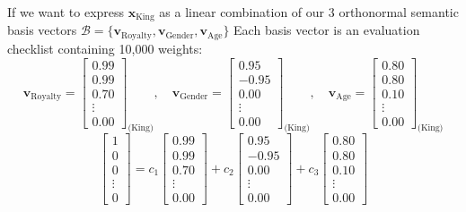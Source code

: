 \documentclass[DIV=20,oneside]{scrartcl}
\begin{document}
If we want to express $\mathbf{x}_{\text{King}}$ as a linear combination of our 3 orthonormal semantic basis vectors $\mathcal{B} = \{\mathbf{v}_{\text{Royalty}}, \mathbf{v}_{\text{Gender}}, \mathbf{v}_{\text{Age}}\}$
Each basis vector is an evaluation checklist containing 10,000 weights:
$$\mathbf{v}_{\text{Royalty}} = \begin{bmatrix} 0.99 \\ 0.99 \\ 0.70 \\ \vdots \\ 0.00 \end{bmatrix}_{\text{(King)}} , \quad \mathbf{v}_{\text{Gender}} = \begin{bmatrix} 0.95 \\ -0.95 \\ 0.00 \\ \vdots \\ 0.00 \end{bmatrix}_{\text{(King)}} , \quad \mathbf{v}_{\text{Age}} = \begin{bmatrix} 0.80 \\ 0.80 \\ 0.10 \\ \vdots \\ 0.00 \end{bmatrix}_{\text{(King)}}$$
$$\begin{bmatrix} 1 \\ 0 \\ 0 \\ \vdots \\ 0 \end{bmatrix} = c_1 \begin{bmatrix} 0.99 \\ 0.99 \\ 0.70 \\ \vdots \\ 0.00 \end{bmatrix} + c_2 \begin{bmatrix} 0.95 \\ -0.95 \\ 0.00 \\ \vdots \\ 0.00 \end{bmatrix} + c_3 \begin{bmatrix} 0.80 \\ 0.80 \\ 0.10 \\ \vdots \\ 0.00 \end{bmatrix}$$
\end{document}
